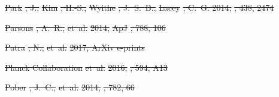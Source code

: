 \documentclass[numberedappendix]{emulateapj}
\providecommand{\DIFdel}[1]{{\protect\color{red}\sout{#1}}}                      %
\begin{document}
\DIFdel{Park}%
\DIFdel{, J., }%
\DIFdel{Kim}%
\DIFdel{, H.-S., }%
\DIFdel{Wyithe}%
\DIFdel{, J.~S.~B., }%
\DIFdel{Lacey}%
\DIFdel{, C.~G. 2014, }%
\DIFdel{,
  438, 2474
}%

\DIFdel{Parsons}%
\DIFdel{, A.~R., }%
\DIFdel{et~al.}%
\DIFdel{2014, }%
\DIFdel{ApJ}%
\DIFdel{, 788, 106
}%

\DIFdel{Patra}%
\DIFdel{, N., }%
\DIFdel{et~al.}%
\DIFdel{2017, ArXiv e-prints
}%

\DIFdel{Planck Collaboration}%
\DIFdel{et~al.}%
\DIFdel{2016, }%
\DIFdel{, 594, A13
}%

\DIFdel{Pober}%
\DIFdel{, J.~C., }%
\DIFdel{et~al.}%
\DIFdel{2014, }%
\DIFdel{, 782, 66
}%
\end{document}
